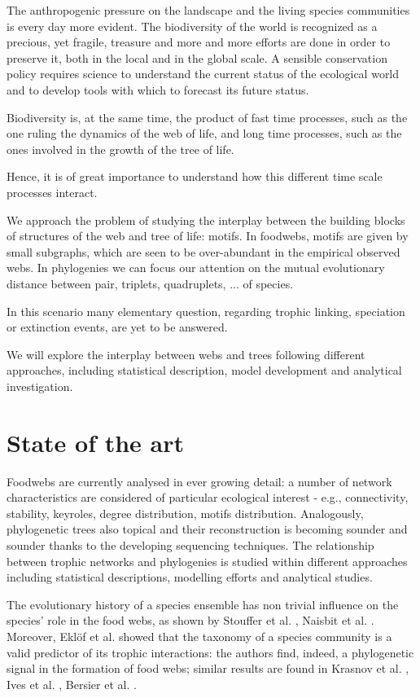 \documentclass[12pt,a4paper]{report}
\begin{document}
The anthropogenic pressure on the landscape and the living species communities is every day more evident. The biodiversity of the world is recognized as a precious, yet fragile, treasure and more and more efforts are done in order to preserve it, both in the local and in the global scale. A sensible conservation policy requires science to understand the current status of the ecological world and to develop tools with which to forecast its future status.

Biodiversity is, at the same time, the product of fast time processes, such as the one ruling the dynamics of the web of life, and long time processes, such as the ones involved in the growth of the tree of life.

Hence, it is of great importance to understand how this different time scale processes interact.

We approach the problem of studying the interplay between the building blocks of structures of the web and tree of life: motifs. In foodwebs, motifs are given by small subgraphs, which are seen to be over-abundant in the empirical observed webs. In phylogenies we can focus our attention on the mutual evolutionary distance between pair, triplets, quadruplets, ... of species.

In this scenario many elementary question, regarding trophic linking, speciation or extinction events, are yet to be answered.

We will explore the interplay between webs and trees following different approaches, including statistical description, model development and analytical investigation.



\chapter{State of the art}
Foodwebs are currently analysed in ever growing detail: a number of network characteristics are considered of particular ecological interest - e.g., connectivity, stability, keyroles, degree distribution, motifs distribution. Analogously, phylogenetic trees also topical and their reconstruction is becoming sounder and sounder thanks to the developing sequencing techniques. The relationship between trophic networks and phylogenies is studied within different approaches including statistical descriptions, modelling efforts and analytical studies.

The evolutionary history of a species ensemble has non trivial influence on the species' role in the food webs, as shown by Stouffer et al. \cite{stouffer_evolutionary_2012}, Naisbit et al. \cite{naisbit_phylogeny_2012}. Moreover, Ekl\"{o}f et al. \cite{eklof_relevance_2012} showed that the taxonomy of a species community is a valid predictor of its trophic interactions: the authors find, indeed, a phylogenetic signal in the formation of food webs; similar results are found in Krasnov et al. \cite{krasnov_phylogenetic_2012}, Ives et al. \cite{ives_phylogenetic_2006}, Bersier et al. \cite{bersier_signature_2008}.
\end{document}
